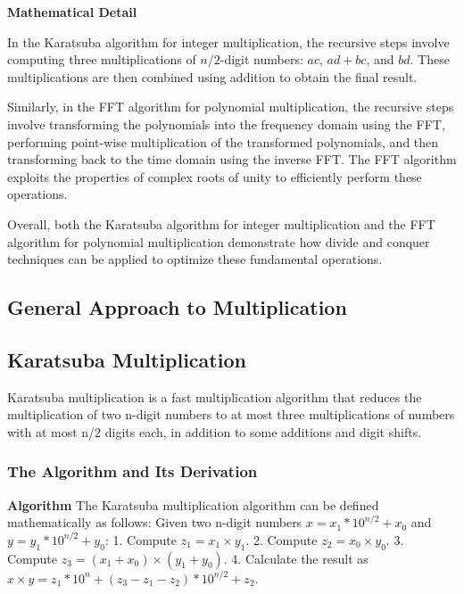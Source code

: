 \documentclass[12pt]{book} %
\begin{document}
\textbf{Mathematical Detail}

In the Karatsuba algorithm for integer multiplication, the recursive steps involve computing three multiplications of \(n/2\)-digit numbers: \(ac\), \(ad + bc\), and \(bd\). These multiplications are then combined using addition to obtain the final result.

Similarly, in the FFT algorithm for polynomial multiplication, the recursive steps involve transforming the polynomials into the frequency domain using the FFT, performing point-wise multiplication of the transformed polynomials, and then transforming back to the time domain using the inverse FFT. The FFT algorithm exploits the properties of complex roots of unity to efficiently perform these operations.

Overall, both the Karatsuba algorithm for integer multiplication and the FFT algorithm for polynomial multiplication demonstrate how divide and conquer techniques can be applied to optimize these fundamental operations.
\subsection{General Approach to Multiplication}

\subsection{Karatsuba Multiplication}
Karatsuba multiplication is a fast multiplication algorithm that reduces the multiplication of two n-digit numbers to at most three multiplications of numbers with at most n/2 digits each, in addition to some additions and digit shifts.
\subsubsection{The Algorithm and Its Derivation}

\textbf{Algorithm}
The Karatsuba multiplication algorithm can be defined mathematically as follows:
Given two n-digit numbers $x = x_1*10^{n/2} + x_0$ and $y = y_1*10^{n/2} + y_0$:
1. Compute $z_1 = x_1 \times y_1$.
2. Compute $z_2 = x_0 \times y_0$.
3. Compute $z_3 = (x_1 + x_0) \times (y_1 + y_0)$.
4. Calculate the result as $x \times y = z_1*10^n + (z_3 - z_1 - z_2)*10^{n/2} + z_2$.
\end{document}
